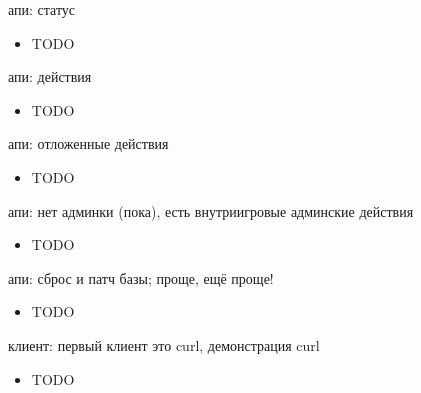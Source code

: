 \documentclass[aspectratio=169,handout,bigger]{beamer}
\begin{document}

\begin{frame}{апи: статус}
  \begin{itemize}
    \item TODO
  \end{itemize}
\end{frame}


\begin{frame}{апи: действия}
  \begin{itemize}
    \item TODO
  \end{itemize}
\end{frame}


\begin{frame}{апи: отложенные действия}
  \begin{itemize}
    \item TODO
  \end{itemize}
\end{frame}


\begin{frame}{апи: нет админки (пока), есть внутриигровые админские действия}
  \begin{itemize}
    \item TODO
  \end{itemize}
\end{frame}


\begin{frame}{апи: сброс и патч базы; проще, ещё проще!}
  \begin{itemize}
    \item TODO
  \end{itemize}
\end{frame}


\begin{frame}{клиент: первый клиент это curl, демонстрация curl}
  \begin{itemize}
    \item TODO
  \end{itemize}
\end{frame}
\end{document}

